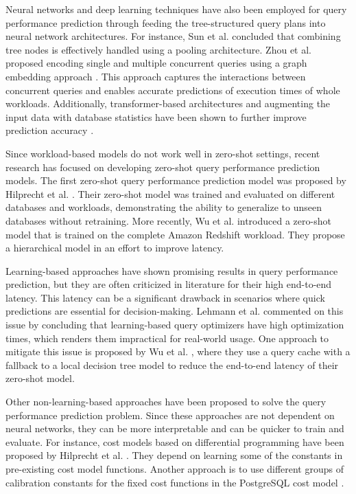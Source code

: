 Neural networks and deep learning techniques have also been employed for query performance prediction through feeding the tree-structured query plans into neural network architectures. For instance, Sun et al. \cite{sun2019end} concluded that combining tree nodes is effectively handled using a pooling architecture. Zhou et al. proposed encoding single and multiple concurrent queries using a graph embedding approach \cite{zhou2020query}. This approach captures the interactions between concurrent queries and enables accurate predictions of execution times of whole workloads. Additionally, transformer-based architectures and augmenting the input data with database statistics have been shown to further improve prediction accuracy \cite{zhao2022queryformer}.

Since workload-based models do not work well in zero-shot settings, recent research has focused on developing zero-shot query performance prediction models. The first zero-shot query performance prediction model was proposed by Hilprecht et al. \cite{hilprecht2022zero}. Their zero-shot model was trained and evaluated on different databases and workloads, demonstrating the ability to generalize to unseen databases without retraining. More recently, Wu et al. \cite{wu2024stage} introduced a zero-shot model that is trained on the complete Amazon Redshift \cite{gupta2015amazon} workload. They propose a hierarchical model in an effort to improve latency.

Learning-based approaches have shown promising results in query performance prediction, but they are often criticized in literature for their high end-to-end latency. This latency can be a significant drawback in scenarios where quick predictions are essential for decision-making. Lehmann et al. \cite{lehmann2023your} commented on this issue by concluding that learning-based query optimizers have high optimization times, which renders them impractical for real-world usage. One approach to mitigate this issue is proposed by Wu et al. \cite{wu2024stage}, where they use a query cache with a fallback to a local decision tree model to reduce the end-to-end latency of their zero-shot model.

Other non-learning-based approaches have been proposed to solve the query performance prediction problem. Since these approaches are not dependent on neural networks, they can be more interpretable and can be quicker to train and evaluate. For instance, cost models based on differential programming have been proposed by Hilprecht et al. \cite{hilprecht2020dbms}. They depend on learning some of the constants in pre-existing cost model functions. Another approach is to use different groups of calibration constants for the fixed cost functions in the PostgreSQL cost model \cite{yang2023rethinking}. 

